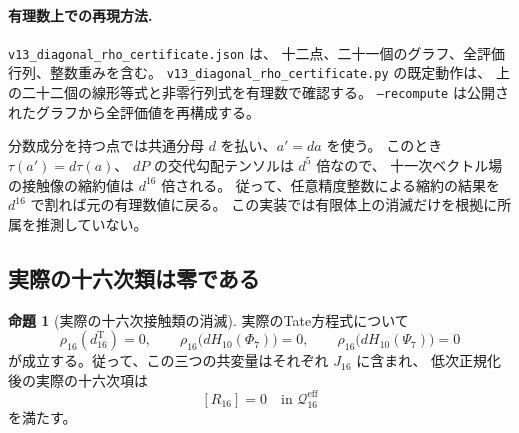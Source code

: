 \documentclass[a4paper,11pt]{ltjsarticle}
\theoremstyle{definition}
\newtheorem{theorem}{命題}[section]
\begin{document}
\paragraph{有理数上での再現方法.}
\texttt{v13\_diagonal\_rho\_certificate.json} は、
十二点、二十一個のグラフ、全評価行列、整数重みを含む。
\texttt{v13\_diagonal\_rho\_certificate.py} の既定動作は、
上の二十二個の線形等式と非零行列式を有理数で確認する。
\texttt{--recompute} は公開されたグラフから全評価値を再構成する。

分数成分を持つ点では共通分母 $d$ を払い、$a'=da$ を使う。
このとき $\tau(a')=d\tau(a)$、
$dP$ の交代勾配テンソルは $d^5$ 倍なので、
十一次ベクトル場の接触像の縮約値は $d^{16}$ 倍される。
従って、任意精度整数による縮約の結果を $d^{16}$ で割れば元の有理数値に戻る。
この実装では有限体上の消滅だけを根拠に所属を推測していない。

\subsection{実際の十六次類は零である}
\label{subsec:v13-actual-sixteenth-zero}

\begin{theorem}[実際の十六次接触類の消滅]
\label{thm:v13-actual-sixteenth-class}
実際のTate方程式について
\[
 \rho_{16}(d^{\mathrm T}_{16})=0,\qquad
 \rho_{16}\bigl(dH_{10}(\Phi_7)\bigr)=0,\qquad
 \rho_{16}\bigl(dH_{10}(\Psi_7)\bigr)=0
\]
が成立する。従って、この三つの共変量はそれぞれ $J_{16}$ に含まれ、
低次正規化後の実際の十六次項は
\[
 \boxed{[R_{16}]=0\quad\text{in }\mathcal Q^{\mathrm{eff}}_{16}}
\]
を満たす。
\end{theorem}
\end{document}
